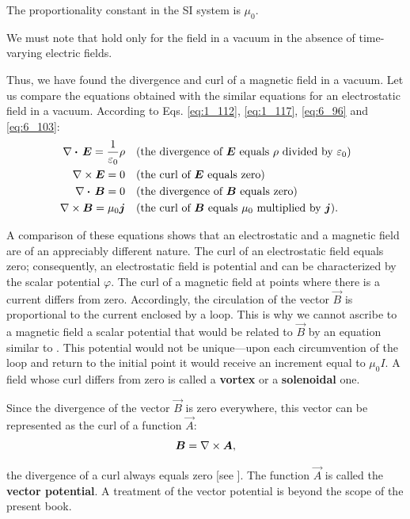 \noindent
The proportionality constant in the SI system is $\mu_0$.

We must note that  hold only for the field in a vacuum in the absence of time-varying electric fields.

Thus, we have found the divergence and curl of a magnetic field in a vacuum. Let us compare the equations obtained with the similar equations for an electrostatic field in a vacuum. According to Eqs. \eqref{eq:1_112}, \eqref{eq:1_117}, \eqref{eq:6_96} and \eqref{eq:6_103}:
\begin{align*}
    \nabla\boldsymbol{\cdot}\,\boldsymbol{E} = \frac{1}{\varepsilon_0}\rho &\quad \text{(the divergence of $\boldsymbol{E}$ equals $\rho$ divided by $\varepsilon_0$)}\\
    \nabla\times\boldsymbol{E} = 0 &\quad \text{(the curl of $\boldsymbol{E}$ equals zero)}\\
    \nabla\boldsymbol{\cdot}\,\boldsymbol{B} = 0 &\quad \text{(the divergence of $\boldsymbol{B}$ equals zero)}\\
    \nabla\times\boldsymbol{B} = \mu_0 \boldsymbol{j} &\quad \text{(the curl of $\boldsymbol{B}$ equals $\mu_0$ multiplied by $\boldsymbol{j}$)}.
\end{align*}

A comparison of these equations shows that an electrostatic and a magnetic field are of an appreciably different nature. The curl of an electrostatic field equals zero; consequently, an electrostatic field is potential and can be characterized by the scalar potential $\varphi$. The curl of a magnetic field at points where there is a current differs from zero. Accordingly, the circulation of the vector $\vec{B}$ is proportional to the current enclosed by a loop. This is why we cannot ascribe to a magnetic field a scalar potential that would be related to $\vec{B}$ by an equation similar to . This potential would not be unique---upon each circumvention of the loop and return to the initial point it would receive an increment equal to $\mu_0 I$. A field
whose curl differs from zero is called a \textbf{vortex} or a \textbf{solenoidal} one.

Since the divergence of the vector $\vec{B}$ is zero everywhere, this vector can be represented as the curl of a function $\vec{A}$:
\begin{equation}\label{eq:6_104}
    \boldsymbol{B} = \nabla\times\boldsymbol{A},
\end{equation}

\noindent
the divergence of a curl always equals zero [see ]. The function $\vec{A}$ is called the \textbf{vector potential}. A treatment of the vector potential is beyond the scope of the present book.

